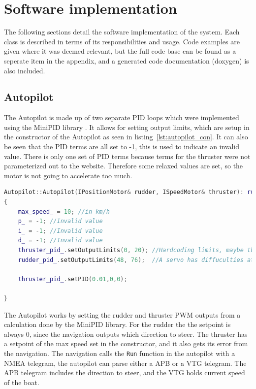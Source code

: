 \section{Software implementation}
\label{sec:software_implementation}
The following sections detail the software implementation of the system. Each class is described in terms of its responsibilities and usage. Code examples are given where it was deemed relevant, but the full code base can be found as a seperate item in the appendix, and a generated code documentation (doxygen) is also included.

\subsection{Autopilot}
The Autopilot is made up of two separate PID loops which were implemented using the MiniPID library \cite{minipid}. It allows for setting output limits, which are setup in the constructor of the Autopilot as seen in listing~\ref{lst:autopilot_con}. It can also be seen that the PID terms are all set to -1, this is used to indicate an invalid value. There is only one set of PID terms because terms for the thruster were not parameterized out to the website. Therefore some relaxed values are set, so the motor is not going to accelerate too much. 

\begin{lstlisting}[caption = {Constructor method of the Autopilot}, captionpos=b, label={lst:autopilot_con}, language=C++,firstnumber=1]
Autopilot::Autopilot(IPositionMotor& rudder, ISpeedMotor& thruster): rudder_pid_(0, 0, 0), thruster_pid_(1,0,0), rudder_(rudder), thruster_(thruster)
{
	max_speed_ = 10; //in km/h
	p_ = -1; //Invalid value
	i_ = -1; //Invalid value
	d_ = -1; //Invalid value
	thruster_pid_.setOutputLimits(0, 20); //Hardcoding limits, maybe this should be done through the user interface
	rudder_pid_.setOutputLimits(48, 76);  //A servo has diffuculties at the edges ei. 0 and 90 so it is limited

	thruster_pid_.setPID(0.01,0,0);

}
\end{lstlisting}

The Autopilot works by setting the rudder and thruster PWM outputs from a calculation done by the MiniPID library. For the rudder the the setpoint is always 0, since the navigation outputs which direction to steer. The thruster has a setpoint of the max speed set in the constructor, and it also gets its error from the navigation. The navigation calls the \texttt{Run} function in the autopilot with a NMEA telegram, the autopilot can parse either a APB or a VTG telegram. The APB telegram includes the direction to steer, and the VTG holds current speed of the boat. 

